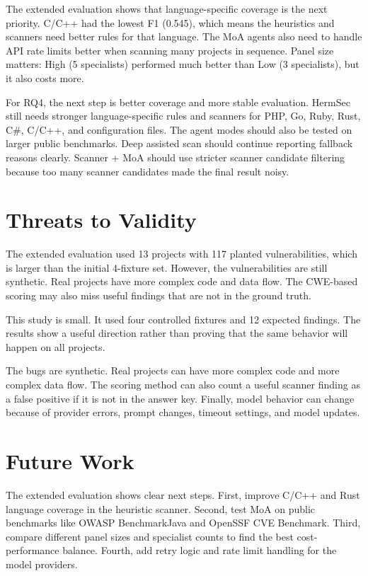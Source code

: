 \documentclass[sigconf,nonacm]{acmart}
\begin{document}
The extended evaluation shows that language-specific coverage is the next priority. C/C++ had the lowest F1 (0.545), which means the heuristics and scanners need better rules for that language. The MoA agents also need to handle API rate limits better when scanning many projects in sequence. Panel size matters: High (5 specialists) performed much better than Low (3 specialists), but it also costs more.

For RQ4, the next step is better coverage and more stable evaluation. HermSec still needs stronger language-specific rules and scanners for PHP, Go, Ruby, Rust, C\#, C/C++, and configuration files. The agent modes should also be tested on larger public benchmarks. Deep assisted scan should continue reporting fallback reasons clearly. Scanner + MoA should use stricter scanner candidate filtering because too many scanner candidates made the final result noisy.

\section{Threats to Validity}

The extended evaluation used 13 projects with 117 planted vulnerabilities, which is larger than the initial 4-fixture set. However, the vulnerabilities are still synthetic. Real projects have more complex code and data flow. The CWE-based scoring may also miss useful findings that are not in the ground truth.

This study is small. It used four controlled fixtures and 12 expected findings. The results show a useful direction rather than proving that the same behavior will happen on all projects.

The bugs are synthetic. Real projects can have more complex code and more complex data flow. The scoring method can also count a useful scanner finding as a false positive if it is not in the answer key. Finally, model behavior can change because of provider errors, prompt changes, timeout settings, and model updates.

\section{Future Work}

The extended evaluation shows clear next steps. First, improve C/C++ and Rust language coverage in the heuristic scanner. Second, test MoA on public benchmarks like OWASP BenchmarkJava and OpenSSF CVE Benchmark. Third, compare different panel sizes and specialist counts to find the best cost-performance balance. Fourth, add retry logic and rate limit handling for the model providers.
\end{document}
